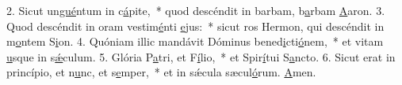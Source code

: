 2. Sicut un\uline{gué}ntum in c\uline{á}pite,~* quod descéndit in barbam, b\uline{a}rbam \uline{A}aron.
3. Quod descéndit in oram vestim\uline{é}nti \uline{e}jus:~* sicut ros Hermon, qui descéndit in m\uline{o}ntem S\uline{i}on.
4. Quóniam illic mandávit Dóminus bened\uline{i}cti\uline{ó}nem,~* et vitam \uline{u}sque in s\uline{ǽ}culum.
5. Glória P\uline{a}tri, et F\uline{í}lio,~* et Spir\uline{í}tui S\uline{a}ncto.
6. Sicut erat in princípio, et n\uline{u}nc, et s\uline{e}mper,~* et in sǽcula sæcul\uline{ó}rum. \uline{A}men.
